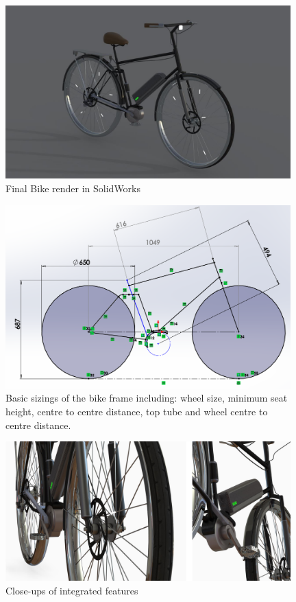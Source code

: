 \documentclass[a4paper,11pt]{article}
\begin{document}
\begin{figure}[!ht]
	\centering
	\includegraphics[width=0.98\textwidth]{bikeren}
	\caption{Final Bike render in SolidWorks}
\end{figure}

\begin{figure}[!ht]
	\centering
	\includegraphics[width=0.98\textwidth]{bikedim}
	\caption{Basic sizings of the bike frame including: wheel size, minimum seat height, centre to centre distance, top tube and wheel centre to centre distance.}
\end{figure}

\begin{figure}[!ht]
	\centering
	\includegraphics[width=0.98\textwidth]{bikeclose}
	\caption{Close-ups of integrated features}
\end{figure}
\end{document}
